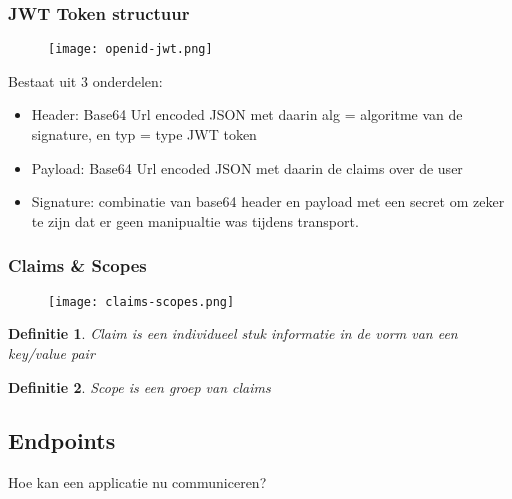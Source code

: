 \documentclass{article}
\newtheorem{theorem}{Definitie}[section]
\begin{document}
\subsubsection{JWT Token structuur}

\begin{figure}[H]
    \centering
    \texttt{[image: openid-jwt.png]}
\end{figure}


Bestaat uit 3 onderdelen:

\begin{itemize}
    \item Header: Base64 Url encoded JSON met daarin alg = algoritme van de signature, en typ = type JWT token
    \item Payload: Base64 Url encoded JSON met daarin de claims over de user
    \item Signature: combinatie van base64 header en payload met een secret om zeker te zijn dat er geen manipualtie was tijdens transport.
\end{itemize}

\subsubsection{Claims \& Scopes}

\begin{figure}[H]
    \centering
    \texttt{[image: claims-scopes.png]}
    \caption{}
\end{figure}


\begin{theorem}
    Claim is een individueel stuk informatie in de vorm van een key/value pair
\end{theorem}

\begin{theorem}
    Scope is een groep van claims
\end{theorem}

\subsection{Endpoints}

Hoe kan een applicatie nu communiceren?
\end{document}
